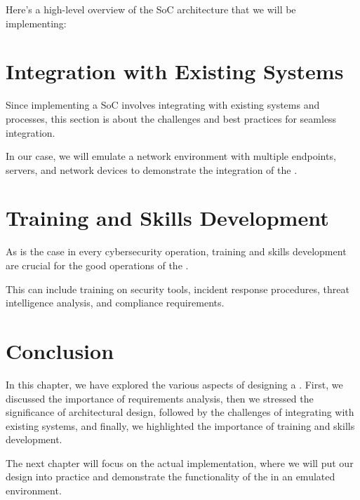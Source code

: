 Here's a high-level overview of the SoC architecture that we will be implementing:


\section{Integration with Existing Systems}

Since implementing a SoC involves integrating with existing systems and processes, this section is about the challenges and best practices for seamless integration.

In our case, we will emulate a network environment with multiple endpoints, servers, and network devices to demonstrate the integration of the .

\section{Training and Skills Development}

As is the case in every cybersecurity operation, training and skills development are crucial for the good operations of the .

This can include training on security tools, incident response procedures, threat intelligence analysis, and compliance requirements.


\setcounter{secnumdepth}{0} %
\section{Conclusion}
In this chapter, we have explored the various aspects of designing a .
First, we discussed the importance of requirements analysis, then we stressed the significance of architectural design, followed by the challenges of integrating with existing systems, and finally, we highlighted the importance of training and skills development.

The next chapter will focus on the actual implementation, where we will put our design into practice and demonstrate the functionality of the  in an emulated environment.
